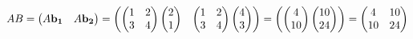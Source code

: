 \[
    AB = \begin{pmatrix}
        A\bf{b}_1 & A\bf{b}_2
    \end{pmatrix}
    = 
    \begin{pmatrix}
        \begin{pmatrix}
            1 & 2 \\ 3 & 4
        \end{pmatrix}
        \begin{pmatrix}
            2 \\ 1 
        \end{pmatrix}
        &
        \begin{pmatrix}
            1 & 2 \\ 3 & 4
        \end{pmatrix}
        \begin{pmatrix}
            4 \\ 3 
        \end{pmatrix}
    \end{pmatrix}
    = 
    \begin{pmatrix}
        \begin{pmatrix}
            4 \\ 10 
        \end{pmatrix}
        \begin{pmatrix}
            10 \\ 24
        \end{pmatrix}
    \end{pmatrix}
    = 
    \begin{pmatrix}
        4 & 10 \\ 10 & 24
    \end{pmatrix}
\]

